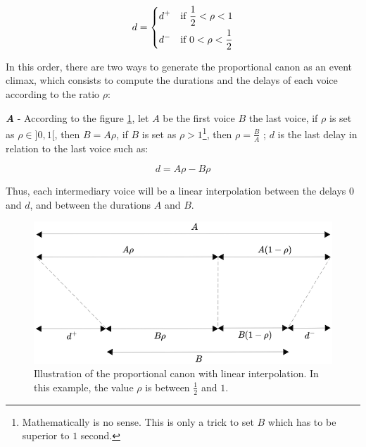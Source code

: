\[
d=
\begin{dcases}
	 d^+ & \text{if }  \frac{1}{2} < \rho < 1\\
	d^- & \text{if }   0 < \rho < \frac{1}{2} 
   \end{dcases}
\]
 
 \bigskip
 
  In this order, there are two ways to generate the proportional canon as an event climax, which consists to compute the durations and the delays of each voice according to the ratio $\rho$:
   
\bigskip

\textbf{\textit{A}} - 
According to the figure \ref{canon1}, let $A$ be the first voice $B$ the last voice, if $\rho$ is set as $\rho \in ]0,1[$, then $B=A\rho$, if $B$ is set as $\rho > 1$\footnote{Mathematically is no sense. This is only a trick to set $B$ which has to be superior to $1$ second.}, then $\rho=\frac{B}{A}$ ; $d$ is the last delay in relation to the last voice such as:
  
\[
d=A\rho-B\rho 
\]

  \noindent Thus, each intermediary voice will be a linear interpolation between the delays $0$ and $d$, and between the durations $A$ and $B$.
  
  
\begin{figure}[h]
\begin{center}
\includegraphics[scale=0.8]{img/3499}
\caption{Illustration of the proportional canon with linear interpolation. In this example, the value $\rho$ is between $\frac{1}{2}$ and $1$. 
}
\label{canon1}
\end{center}
\end{figure}

